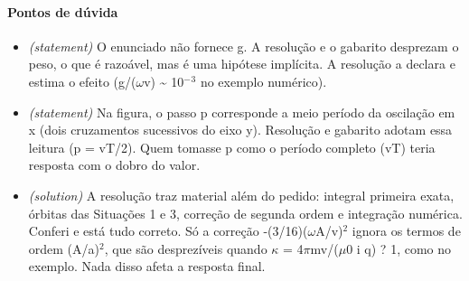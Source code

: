 \documentclass{article}%
\begin{document}
\paragraph{Pontos de dúvida}%
\begin{itemize}%
\item%
\textit{(statement)} O enunciado não fornece g. A resolução e o gabarito desprezam o peso, o que é razoável, mas é uma hipótese implícita. A resolução a declara e estima o efeito (g/($\omega$v) \textasciitilde{} 10$^{-}$$^3$ no exemplo numérico).%
\item%
\textit{(statement)} Na figura, o passo p corresponde a meio período da oscilação em x (dois cruzamentos sucessivos do eixo y). Resolução e gabarito adotam essa leitura (p = vT/2). Quem tomasse p como o período completo (vT) teria resposta com o dobro do valor.%
\item%
\textit{(solution)} A resolução traz material além do pedido: integral primeira exata, órbitas das Situações 1 e 3, correção de segunda ordem e integração numérica. Conferi e está tudo correto. Só a correção -(3/16)($\omega$A/v)$^2$ ignora os termos de ordem (A/a)$^2$, que são desprezíveis quando $\kappa$ = 4$\pi$mv/($\mu$0 i q) ? 1, como no exemplo. Nada disso afeta a resposta final.%
\end{itemize}%
\end{document}
